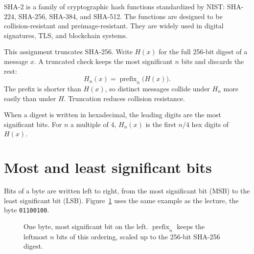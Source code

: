 \documentclass[11pt,a4paper]{article}
\newcommand{\Hn}{H_{n}}
\newcommand{\prefix}{\operatorname{prefix}}
\begin{document}
SHA-2 is a family of cryptographic hash functions standardized by NIST:
SHA-224, SHA-256, SHA-384, and SHA-512.
The functions are designed to be collision-resistant and preimage-resistant.
They are widely used in digital signatures, TLS, and blockchain systems.

This assignment truncates SHA-256.
Write \(H(x)\) for the full 256-bit digest of a message \(x\).
A truncated check keeps the most significant \(n\) bits and discards the rest:
\begin{equation}
  \Hn(x) = \prefix_{n}\bigl(H(x)\bigr).
  \label{eq:trunc}
\end{equation}
The prefix is shorter than \(H(x)\), so distinct messages collide under
\(\Hn\) more easily than under \(H\).
Truncation reduces collision resistance.

When a digest is written in hexadecimal, the leading digits are the most
significant bits.
For \(n\) a multiple of \(4\), \(\Hn(x)\) is the first \(n/4\) hex digits of
\(H(x)\).

\section{Most and least significant bits}
\label{sec:msb}

Bits of a byte are written left to right, from the most significant bit
(MSB) to the least significant bit (LSB).
Figure~\ref{fig:msb} uses the same example as the lecture,
the byte \texttt{01100100}.

\begin{figure}[ht]
  \centering
  \caption{One byte, most significant bit on the left.
           \(\prefix_{n}\) keeps the leftmost \(n\) bits of this ordering,
           scaled up to the 256-bit SHA-256 digest.}
  \label{fig:msb}
\end{figure}
\end{document}
